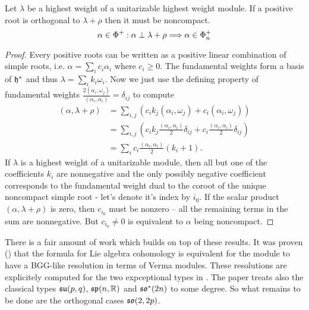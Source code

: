 \begin{lemma}\label{lem:singular_are_noncompact}
 Let $\lambda$ be a highest weight of a unitarizable highest weight module. If a positive root is orthogonal to $\lambda + \rho$ then it must be noncompact.
 \[
  \alpha \in \Phi^+: \alpha \perp \lambda + \rho \Longrightarrow \alpha \in \Phi^+_n
 \]
\end{lemma}
\begin{proof}
 Every positive roots can be written as a positive linear combination of simple roots, i.e. $\alpha = \sum_i c_i \alpha_i$ where $c_i \geq 0$. The fundamental weights form a basis of $\mathfrak{h}^*$ and thus $\lambda = \sum_i k_i \omega_i$. Now we just use the defining property of fundamental weights $\frac{2(\alpha_i,\omega_j)}{(\alpha_i,\alpha_i)} = \delta_{ij}$ to compute
 \begin{align*}
  (\alpha,\lambda+\rho) & = \sum_{i,j} \left(  c_i k_j (\alpha_i,\omega_j) + c_i (\alpha_i,\omega_j) \right ) \\
			& = \sum_{i,j} \left( c_i k_j \frac{(\alpha_i,\alpha_i)}{2} \delta_{ij} + c_i \frac{(\alpha_i,\alpha_i)}{2} \delta_{ij} \right ) \\
			& = \sum_i c_i \frac{(\alpha_i,\alpha_i)}{2} (k_i + 1).
 \end{align*}
 If $\lambda$ is a highest weight of a unitarizable module, then all but one of the coefficients $k_i$ are nonnegative and the only possibly negative coefficient corresponds to the fundamental weight dual to the coroot of the unique noncompact simple root - let's denote it's index by $i_0$. If the scalar product $(\alpha, \lambda+\rho)$ is zero, then $c_{i_0}$ must be nonzero -- all the remaining terms in the sum are nonnegative. But $c_{i_0} \neq 0$ is equivalent to $\alpha$ being noncompact.
\end{proof}


There is a fair amount of work which builds on top of these results. It was proven (\cite{enright_hilbert_2004,boe_kostant_2009}) that the formula for Lie algebra cohomology is equivalent for the module to have a BGG-like resolution in terms of Verma modules. These resolutions are explicitely computed for the two expceptional types in \cite{enright_resolutions_2004}. The paper \cite{enright_hilbert_2004} treats also the classical types $\mathfrak{su}(p,q)$, $\mathfrak{sp}(n,\mathbb{R})$ and $\mathfrak{so}^*(2n)$ to some degree. So what remains to be done are the orthogonal cases $\mathfrak{so}(2,2p)$. 

